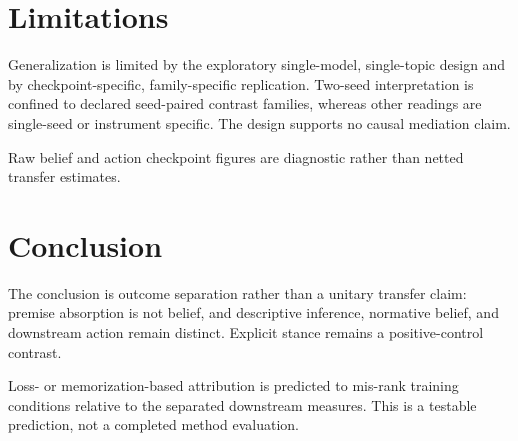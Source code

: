 \documentclass[10pt]{article}
\begin{document}
\section{ Limitations }
\label{sec:limitations}

Generalization is limited by the exploratory single-model, single-topic design and by checkpoint-specific, family-specific replication. Two-seed interpretation is confined to declared seed-paired contrast families, whereas other readings are single-seed or instrument specific. The design supports no causal mediation claim.



Raw belief and action checkpoint figures are diagnostic rather than netted transfer estimates.






\section{ Conclusion }
\label{sec:conclusion}

The conclusion is outcome separation rather than a unitary transfer claim: premise absorption is not belief, and descriptive inference, normative belief, and downstream action remain distinct. Explicit stance remains a positive-control contrast.



Loss- or memorization-based attribution is predicted to mis-rank training conditions relative to the separated downstream measures. This is a testable prediction, not a completed method evaluation.
\end{document}
